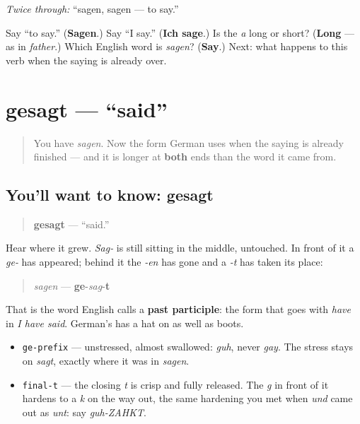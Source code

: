 \emph{Twice through:} \textquotedblleft{}sagen, sagen — to say.\textquotedblright{}

\begin{tcolorbox}[breakable,colback=teal!4,colframe=teal!35!black,title={Before you move on}]
Say \textquotedblleft{}to say.\textquotedblright{} (\textbf{Sagen}.) Say \textquotedblleft{}I say.\textquotedblright{} (\textbf{Ich sage}.) Is the \emph{a} long or short? (\textbf{Long} — as in \emph{father}.) Which English word is \emph{sagen}? (\textbf{Say}.) Next: what happens to this verb when the saying is already over.
\end{tcolorbox}
\section[gesagt]{gesagt — \textquotedblleft{}said\textquotedblright{}}

\label{lesson:GE-C15-gesagt}



\begin{quote}
You have \emph{sagen}. Now the form German uses when the saying is already finished — and it is longer at \textbf{both} ends than the word it came from.
\end{quote}

\subsection*{You'll want to know: gesagt}
\begin{quote}
\textbf{gesagt} — \textquotedblleft{}said.\textquotedblright{}
\end{quote}

Hear where it grew. \emph{Sag-} is still sitting in the middle, untouched. In front of it a \emph{ge-} has appeared; behind it the \emph{-en} has gone and a \emph{-t} has taken its place:

\begin{quote}
\emph{sagen} — \textbf{ge}-\emph{sag}-\textbf{t}
\end{quote}

That is the word English calls a \textbf{past participle}: the form that goes with \emph{have} in \emph{I have said}. German's has a hat on as well as boots.

\begin{sounds}
\begin{itemize}
\raggedright
  \item \texttt{ge-prefix} — unstressed, almost swallowed: \emph{guh}, never \emph{gay}. The stress stays on \emph{sagt}, exactly where it was in \emph{sagen}.
  \item \texttt{final-t} — the closing \emph{t} is crisp and fully released. The \emph{g} in front of it hardens to a \emph{k} on the way out, the same hardening you met when \emph{und} came out as \emph{unt}: say \emph{guh-ZAHKT}.
\end{itemize}
\end{sounds}

